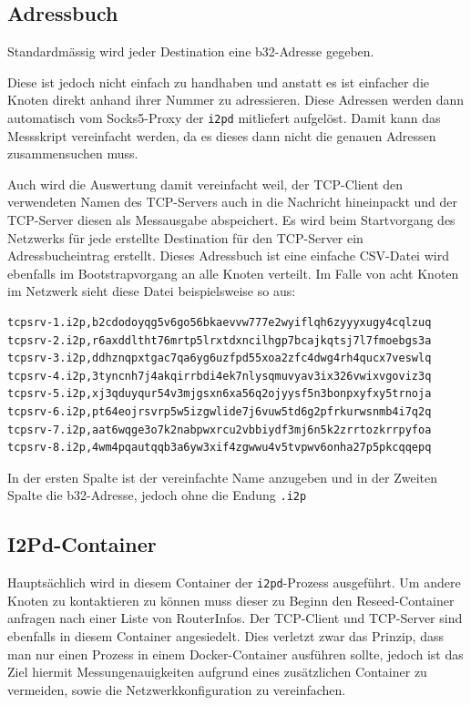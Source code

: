 \subsection{Adressbuch}

Standardmässig wird jeder Destination eine b32-Adresse gegeben.

Diese ist jedoch nicht einfach zu handhaben und anstatt es ist einfacher die Knoten direkt anhand ihrer Nummer zu adressieren.
Diese Adressen werden dann automatisch vom Socks5-Proxy der \lstinline|i2pd| mitliefert aufgelöst.
Damit kann das Messskript vereinfacht werden, da es dieses dann nicht die genauen Adressen zusammensuchen muss.

Auch wird die Auswertung damit vereinfacht weil, der TCP-Client den verwendeten Namen des TCP-Servers auch in die Nachricht hineinpackt und der TCP-Server diesen als Messausgabe abspeichert.
Es wird beim Startvorgang des Netzwerks für jede erstellte Destination für den TCP-Server ein Adressbucheintrag erstellt.
Dieses Adressbuch ist eine einfache CSV-Datei wird ebenfalls im Bootstrapvorgang an alle Knoten verteilt.
Im Falle von acht Knoten im Netzwerk sieht diese Datei beispielsweise so aus:

\begin{lstlisting}
tcpsrv-1.i2p,b2cdodoyqg5v6go56bkaevvw777e2wyiflqh6zyyyxugy4cqlzuq
tcpsrv-2.i2p,r6axddltht76mrtp5lrxtdxncilhgp7bcajkqtsj7l7fmoebgs3a
tcpsrv-3.i2p,ddhznqpxtgac7qa6yg6uzfpd55xoa2zfc4dwg4rh4qucx7veswlq
tcpsrv-4.i2p,3tyncnh7j4akqirrbdi4ek7nlysqmuvyav3ix326vwixvgoviz3q
tcpsrv-5.i2p,xj3qduyqur54v3mjgsxn6xa56q2ojyysf5n3bonpxyfxy5trnoja
tcpsrv-6.i2p,pt64eojrsvrp5w5izgwlide7j6vuw5td6g2pfrkurwsnmb4i7q2q
tcpsrv-7.i2p,aat6wqge3o7k2nabpwxrcu2vbbiydf3mj6n5k2zrrtozkrrpyfoa
tcpsrv-8.i2p,4wm4pqautqqb3a6yw3xif4zgwwu4v5tvpwv6onha27p5pkcqqepq
\end{lstlisting}

In der ersten Spalte ist der vereinfachte Name anzugeben und in der Zweiten Spalte die b32-Adresse, jedoch ohne die Endung \lstinline|.i2p|

\subsection{I2Pd-Container}

Hauptsächlich wird in diesem Container der \lstinline|i2pd|-Prozess ausgeführt.
Um andere Knoten zu kontaktieren zu können muss dieser zu Beginn den Reseed-Container anfragen nach einer Liste von RouterInfos.
Der TCP-Client und TCP-Server sind ebenfalls in diesem Container angesiedelt.
Dies verletzt zwar das Prinzip, dass man nur einen Prozess in einem Docker-Container ausführen sollte,
jedoch ist das Ziel hiermit Messungenauigkeiten aufgrund eines zusätzlichen Container zu vermeiden, sowie die Netzwerkkonfiguration zu vereinfachen.

